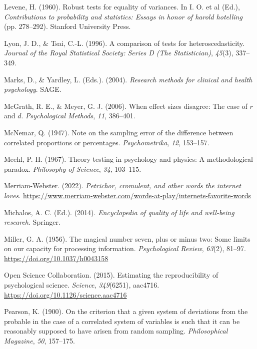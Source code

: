 \documentclass[
  11pt,
  a4paper,
  twoside,symmetric,openright]{book}
\theoremstyle{break}
\theoremstyle{break}
\begin{document}
\begin{CSLReferences}
Levene, H. (1960). Robust tests for equality of variances. In I. O. et al (Ed.), \emph{Contributions to probability and statistics: Essays in honor of harold hotelling} (pp. 278--292). Stanford University Press.

Lyon, J. D., \& Tsai, C.-L. (1996). A comparison of tests for heteroscedasticity. \emph{Journal of the Royal Statistical Society: Series D (The Statistician)}, \emph{45}(3), 337--349.

Marks, D., \& Yardley, L. (Eds.). (2004). \emph{Research methods for clinical and health psychology}. {SAGE}.

McGrath, R. E., \& Meyer, G. J. (2006). When effect sizes disagree: The case of \(r\) and \(d\). \emph{Psychological Methods}, \emph{11}, 386--401.

McNemar, Q. (1947). Note on the sampling error of the difference between correlated proportions or percentages. \emph{Psychometrika}, \emph{12}, 153--157.

Meehl, P. H. (1967). Theory testing in psychology and physics: A methodological paradox. \emph{Philosophy of Science}, \emph{34}, 103--115.

Merriam-Webster. (2022). \emph{Petrichor, cromulent, and other words the internet loves}. \url{https://www.merriam-webster.com/words-at-play/internets-favorite-words}

Michalos, A. C. (Ed.). (2014). \emph{Encyclopedia of quality of life and well-being research}. {Springer}.

Miller, G. A. (1956). The magical number seven, plus or minus two: {Some} limits on our capacity for processing information. \emph{Psychological Review}, \emph{63}(2), 81--97. \url{https://doi.org/10.1037/h0043158}

Open Science Collaboration. (2015). Estimating the reproducibility of psychological science. \emph{Science}, \emph{349}(6251), aac4716. \url{https://doi.org/10.1126/science.aac4716}

Pearson, K. (1900). On the criterion that a given system of deviations from the probable in the case of a correlated system of variables is such that it can be reasonably supposed to have arisen from random sampling. \emph{Philosophical Magazine}, \emph{50}, 157--175.


\end{CSLReferences}
\end{document}
